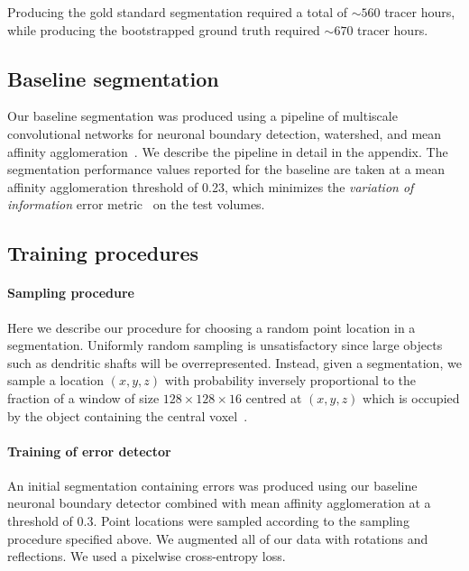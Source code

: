 \documentclass{article}
\begin{document}
Producing the gold standard segmentation required a total of $\sim 560$ tracer hours, while producing the bootstrapped ground truth required $\sim 670$ tracer hours.

\subsection{Baseline segmentation}
Our baseline segmentation was produced using a pipeline of multiscale
convolutional networks for neuronal boundary detection, watershed, and mean
affinity agglomeration~\cite{kisuk}. We describe the pipeline in detail in the
appendix. The segmentation performance values reported for the baseline are
taken at a mean affinity agglomeration threshold of 0.23, which minimizes the
\textsl{variation of information} error metric~\cite{meila2007,vi} on the test
volumes.

\subsection{Training procedures}
\paragraph{Sampling procedure}
\label{sec:sampling}
Here we describe our procedure for choosing a random point location in a
segmentation. Uniformly random sampling is unsatisfactory since large objects
such as dendritic shafts will be overrepresented. Instead, given a segmentation,
we sample a location $(x,y,z)$ with probability inversely proportional to the
fraction of a window of size $128 \times 128 \times 16$ centred at $(x,y,z)$
which is occupied by the object containing the central
voxel~\cite{floodfilling}.

\paragraph{Training of error detector} An initial segmentation containing errors
was produced using our baseline neuronal boundary detector combined with mean
affinity agglomeration at a threshold of 0.3. Point locations were sampled
according to the sampling procedure specified above. We augmented all of our
data with rotations and reflections. We used a pixelwise cross-entropy loss.
\end{document}
